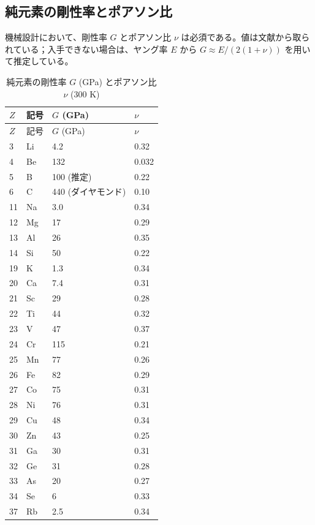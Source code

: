 \documentclass[11pt,a4paper]{article}
\theoremstyle{remark}
\begin{document}
	\subsection{純元素の剛性率とポアソン比}
	\label{subsec:elastic-constants}
	
	機械設計において、剛性率 \(G\) とポアソン比 \(\nu\) は必須である。値は文献から取られている；入手できない場合は、ヤング率 \(E\) から \(G \approx E/(2(1+\nu))\) を用いて推定している。
	
	\begin{longtable}{p{0.6cm}p{1.2cm}p{1.5cm}p{1.5cm}}
		\caption{純元素の剛性率 \(G\) (GPa) とポアソン比 \(\nu\) (300 K)} \label{tab:elastic-constants-all} \\
		\toprule
		\(Z\) & 記号 & \(G\) (GPa) & \(\nu\) \\
		\midrule
		\endfirsthead
		\toprule
		\(Z\) & 記号 & \(G\) (GPa) & \(\nu\) \\
		\midrule
		\endhead
		3  & Li & 4.2 & 0.32 \\
		4  & Be & 132 & 0.032 \\
		5  & B  & 100 (推定) & 0.22 \\
		6  & C  & 440 (ダイヤモンド) & 0.10 \\
		11 & Na & 3.0 & 0.34 \\
		12 & Mg & 17 & 0.29 \\
		13 & Al & 26 & 0.35 \\
		14 & Si & 50 & 0.22 \\
		19 & K  & 1.3 & 0.34 \\
		20 & Ca & 7.4 & 0.31 \\
		21 & Sc & 29 & 0.28 \\
		22 & Ti & 44 & 0.32 \\
		23 & V  & 47 & 0.37 \\
		24 & Cr & 115 & 0.21 \\
		25 & Mn & 77 & 0.26 \\
		26 & Fe & 82 & 0.29 \\
		27 & Co & 75 & 0.31 \\
		28 & Ni & 76 & 0.31 \\
		29 & Cu & 48 & 0.34 \\
		30 & Zn & 43 & 0.25 \\
		31 & Ga & 30 & 0.31 \\
		32 & Ge & 31 & 0.28 \\
		33 & As & 20 & 0.27 \\
		34 & Se & 6 & 0.33 \\
		37 & Rb & 2.5 & 0.34 \\

\end{longtable}
\end{document}
